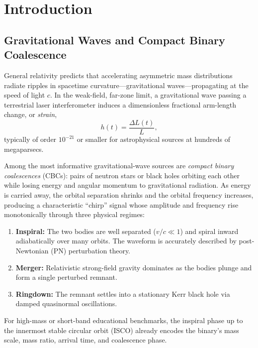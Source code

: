 \documentclass[11pt,a4paper]{report}
\begin{document}
\tableofcontents
\clearpage

\chapter{Introduction}

\section{Gravitational Waves and Compact Binary Coalescence}
General relativity predicts that accelerating asymmetric mass distributions radiate ripples in spacetime curvature---gravitational waves---propagating at the speed of light $c$. In the weak-field, far-zone limit, a gravitational wave passing a terrestrial laser interferometer induces a dimensionless fractional arm-length change, or \emph{strain},
\begin{equation}
h(t) = \frac{\Delta L(t)}{L},
\end{equation}
typically of order $10^{-21}$ or smaller for astrophysical sources at hundreds of megaparsecs.

Among the most informative gravitational-wave sources are \emph{compact binary coalescences} (CBCs): pairs of neutron stars or black holes orbiting each other while losing energy and angular momentum to gravitational radiation. As energy is carried away, the orbital separation shrinks and the orbital frequency increases, producing a characteristic ``chirp'' signal whose amplitude and frequency rise monotonically through three physical regimes:
\begin{enumerate}[leftmargin=1.5em]
    \item \textbf{Inspiral:} The two bodies are well separated ($v/c \ll 1$) and spiral inward adiabatically over many orbits. The waveform is accurately described by post-Newtonian (PN) perturbation theory.
    \item \textbf{Merger:} Relativistic strong-field gravity dominates as the bodies plunge and form a single perturbed remnant.
    \item \textbf{Ringdown:} The remnant settles into a stationary Kerr black hole via damped quasinormal oscillations.
\end{enumerate}
For high-mass or short-band educational benchmarks, the inspiral phase up to the innermost stable circular orbit (ISCO) already encodes the binary's mass scale, mass ratio, arrival time, and coalescence phase.
\end{document}
